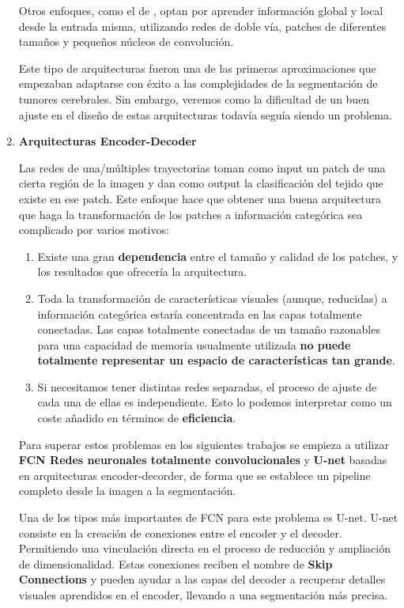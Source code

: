 \begin{enumerate}
				Otros enfoques, como el de \cite{kamnitsas2017efficient}, optan por aprender información global y local desde la entrada misma, utilizando redes de doble vía, patches de diferentes tamaños y pequeños núcleos de convolución. 
				
				Este tipo de arquitecturas fueron una de las primeras aproximaciones que empezaban adaptarse con éxito a las complejidades de la segmentación de tumores cerebrales. Sin embargo, veremos como la dificultad de un buen ajuste en el diseño de estas arquitecturas todavía seguía siendo un problema.
					
				\item \textbf{Arquitecturas Encoder-Decoder}
				
				Las redes de una/múltiples trayectorias toman como input un patch de una cierta región de la imagen y dan como output la clasificación del tejido que existe en ese patch. Este enfoque hace que obtener una buena arquitectura que haga la transformación de los patches a información categórica sea complicado por varios motivos: 
				\begin{enumerate}
					\item Existe una gran \textbf{dependencia} entre el tamaño y calidad de los patches, y los resultados que ofrecería la arquitectura.
					
					\item Toda la transformación de características visuales (aunque, reducidas) a información categórica estaría concentrada en las capas totalmente conectadas. Las capas totalmente conectadas de un tamaño razonables para una capacidad de memoria usualmente utilizada \textbf{no puede totalmente representar un espacio de características tan grande}.
					
					\item Si necesitamos tener distintas redes separadas, el proceso de ajuste de cada una de ellas es independiente. Esto lo podemos interpretar como un coste añadido en términos de \textbf{eficiencia}.
					
				\end{enumerate}
				
				Para superar estos problemas en los siguientes trabajos se empieza a utilizar \textbf{FCN Redes neuronales totalmente convolucionales} y \textbf{U-net} basadas en arquitecturas encoder-decorder, de forma que se establece un pipeline completo desde la imagen a la segmentación.
				
				Una de los tipos más importantes de FCN para este problema es U-net. U-net consiste en la creación de conexiones entre el encoder y el decoder. Permitiendo una vinculación directa en el proceso de reducción y ampliación de dimensionalidad. Estas conexiones reciben el nombre de \textbf{Skip Connections} y pueden ayudar a las capas del decoder a recuperar detalles visuales aprendidos en el encoder, llevando a una segmentación más precisa.
				

\end{enumerate}
